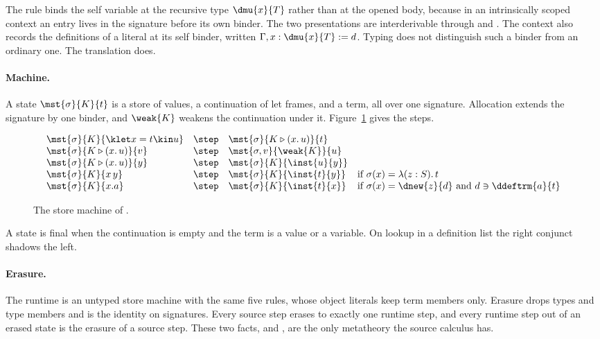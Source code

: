 The rule  binds the self variable at the recursive type $\dmu{x}{T}$ rather than at the opened body, because in an intrinsically scoped context an entry lives in the signature before its own binder. The two presentations are interderivable through  and . The context also records the definitions of a literal at its self binder, written $\Gamma, x : \dmu{x}{T} \mathrel{:=} d$. Typing does not distinguish such a binder from an ordinary one. The translation does.

\paragraph{Machine.}
A state $\mst{\sigma}{K}{t}$ is a store of values, a continuation of let frames, and a term, all over one signature. Allocation extends the signature by one binder, and $\weak{K}$ weakens the continuation under it. Figure~\ref{fig:source-machine} gives the steps.
\begin{figure}
\small
\[
\begin{array}{@{}lcll@{}}
\mst{\sigma}{K}{\klet x = t \kin u} &\step& \mst{\sigma}{K \triangleright (x.\,u)}{t} \\
\mst{\sigma}{K \triangleright (x.\,u)}{v} &\step& \mst{\sigma, v}{\weak{K}}{u} \\
\mst{\sigma}{K \triangleright (x.\,u)}{y} &\step& \mst{\sigma}{K}{\inst{u}{y}} \\
\mst{\sigma}{K}{x\,y} &\step& \mst{\sigma}{K}{\inst{t}{y}} & \text{if } \sigma(x) = \lambda(z : S).\,t \\
\mst{\sigma}{K}{x.a} &\step& \mst{\sigma}{K}{\inst{t}{x}} & \text{if } \sigma(x) = \dnew{z}{d} \text{ and } d \ni \ddeftrm{a}{t}
\end{array}
\]
\caption{The store machine of \DOTMNF.}
\label{fig:source-machine}
\end{figure}
A state is final when the continuation is empty and the term is a value or a variable. On lookup in a definition list the right conjunct shadows the left.

\paragraph{Erasure.}
The runtime is an untyped store machine with the same five rules, whose object literals keep term members only. Erasure drops types and type members and is the identity on signatures. Every source step erases to exactly one runtime step, and every runtime step out of an erased state is the erasure of a source step. These two facts,  and , are the only metatheory the source calculus has.
